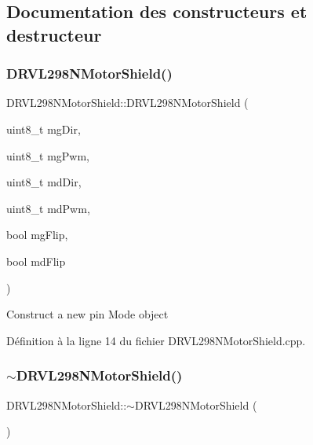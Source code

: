 \subsection{Documentation des constructeurs et destructeur}
\mbox{\label{class_d_r_v_l298_n_motor_shield_afa6e42953652884f15a38df4d5dbc67d}} 
\subsubsection{D\+R\+V\+L298\+N\+Motor\+Shield()}
{\footnotesize\ttfamily D\+R\+V\+L298\+N\+Motor\+Shield\+::\+D\+R\+V\+L298\+N\+Motor\+Shield (\begin{DoxyParamCaption}\item[{uint8\+\_\+t}]{mg\+Dir,  }\item[{uint8\+\_\+t}]{mg\+Pwm,  }\item[{uint8\+\_\+t}]{md\+Dir,  }\item[{uint8\+\_\+t}]{md\+Pwm,  }\item[{bool}]{mg\+Flip,  }\item[{bool}]{md\+Flip }\end{DoxyParamCaption})}

Construct a new pin Mode object

Définition à la ligne 14 du fichier D\+R\+V\+L298\+N\+Motor\+Shield.\+cpp.

\mbox{\label{class_d_r_v_l298_n_motor_shield_a3f015a6aea7ca507f3129de605d5ca2c}} 
\subsubsection{$\sim$\+D\+R\+V\+L298\+N\+Motor\+Shield()}
{\footnotesize\ttfamily D\+R\+V\+L298\+N\+Motor\+Shield\+::$\sim$\+D\+R\+V\+L298\+N\+Motor\+Shield (\begin{DoxyParamCaption}{ }\end{DoxyParamCaption})\hspace{0.3cm}{\ttfamily [virtual]}}



